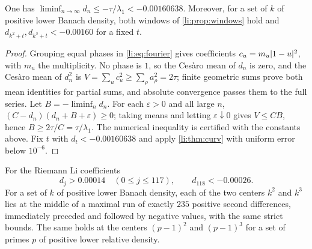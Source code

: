 \begin{proposition}\label{li:prop:negative}
One has $\liminf_{n\to\infty}d_n\le-\tau/\lambda_1<-0.00160638$. Moreover, for a set of $k$ of positive
lower Banach density, both windows of \cref{li:prop:windows} hold and
$d_{k^2+t},d_{k^3+t}<-0.00160$ for a fixed $t$.
\end{proposition}

\begin{proof}
Grouping equal phases in \eqref{li:eq:fourier} gives coefficients $c_u=m_u\lvert1-u\rvert^2$, with $m_u$
the multiplicity. No phase is $1$, so the Ces\`aro mean of $d_n$ is zero, and the Ces\`aro mean
of $d_n^2$ is $V=\sum_uc_u^2\ge\sum_\rho a_\rho^2=2\tau$; finite geometric sums prove both mean
identities for partial sums, and absolute convergence passes them to the full series. Let
$B=-\liminf_nd_n$. For each $\varepsilon>0$ and all large $n$, $(C-d_n)(d_n+B+\varepsilon)\ge0$;
taking means and letting $\varepsilon\downarrow0$ gives $V\le CB$, hence $B\ge2\tau/C=\tau/\lambda_1$.
The numerical inequality is certified with the constants above. Fix $t$ with $d_t<-0.00160638$
and apply \cref{li:thm:curv} with uniform error below $10^{-6}$.
\end{proof}

\begin{theorem}\label{li:thm:firstchange}
For the Riemann Li coefficients
\[
 d_j>0.00014\quad(0\le j\le117),\qquad d_{118}<-0.00026 .
\]
For a set of $k$ of positive lower Banach density, each of the two centers $k^2$ and $k^3$ lies
at the middle of a maximal run of exactly $235$ positive second differences, immediately preceded
and followed by negative values, with the same strict bounds. The same holds at the centers
$(p-1)^2$ and $(p-1)^3$ for a set of primes $p$ of positive lower relative density.
\end{theorem}

